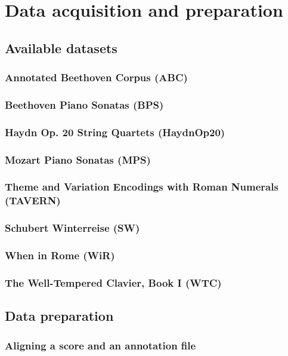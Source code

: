 \chapter{Data acquisition and preparation}
\label{chap:data}


\section{Available datasets}

\subsection{Annotated Beethoven Corpus (ABC)}
\subsection{Beethoven Piano Sonatas (BPS)}
\subsection{Haydn Op. 20 String Quartets (HaydnOp20)}
\subsection{Mozart Piano Sonatas (MPS)}
\subsection{Theme and Variation Encodings with Roman Numerals (TAVERN)}
\subsection{Schubert Winterreise (SW)}
\subsection{When in Rome (WiR)}
\subsection{The Well-Tempered Clavier, Book I (WTC)}

\section{Data preparation}
\subsection{Aligning a score and an annotation file}
